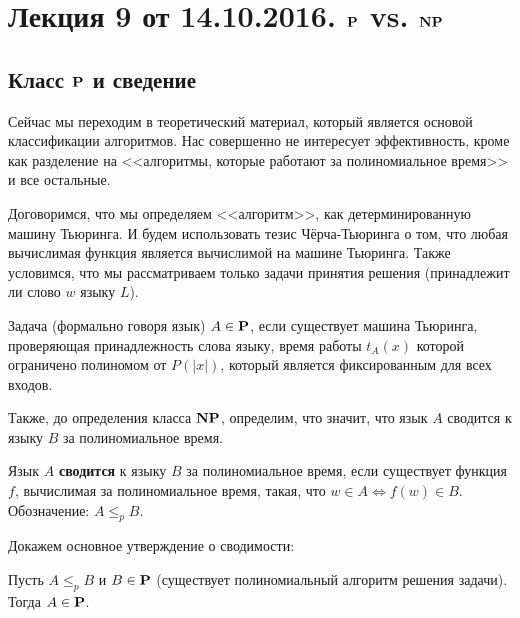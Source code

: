 
% 

\section{Лекция 9 от 14.10.2016. $\mathbf{P}$ vs. $\mathbf{NP}$}

\subsection{Класс $\mathbf{P}$ и сведение}

Сейчас мы переходим в теоретический материал, который является основой
классификации алгоритмов. Нас совершенно не интересует эффективность, кроме
как разделение на <<алгоритмы, которые работают за полиномиальное время>> и все
остальные.

Договоримся, что мы определяем <<алгоритм>>, как детерминированную
машину Тьюринга. И будем
использовать тезис Чёрча-Тьюринга о том, что любая вычислимая функция является
вычислимой на машине Тьюринга. Также условимся, что мы рассматриваем только
задачи принятия решения (принадлежит ли слово $w$ языку $L$).

\begin{Def}
  Задача (формально говоря язык) $A \in \mathbf{P}$, если существует машина Тьюринга,
  проверяющая принадлежность
  слова языку,
  время работы $t_A(x)$ которой ограничено полиномом от $P(|x|)$, который является
  фиксированным для всех входов.
\end{Def}

Также, до определения класса $\mathbf{NP}$, определим,
что значит, что язык $A$ сводится к языку $B$ за полиномиальное время.

\begin{Def}
    Язык $A$ \textbf{сводится} к языку $B$ за полиномиальное время, если 
    существует функция $f$, вычислимая за полиномиальное время, такая, что 
    $w \in A \Longleftrightarrow f(w) \in B$.
    Обозначение: $A \leqslant_p B$.
\end{Def}
Докажем основное утверждение о сводимости:
\begin{Statement}
    Пусть $A \leqslant_p B$ и $B \in \mathbf{P}$ (существует полиномиальный 
    алгоритм решения задачи). Тогда $A \in \mathbf{P}$.
\end{Statement}

